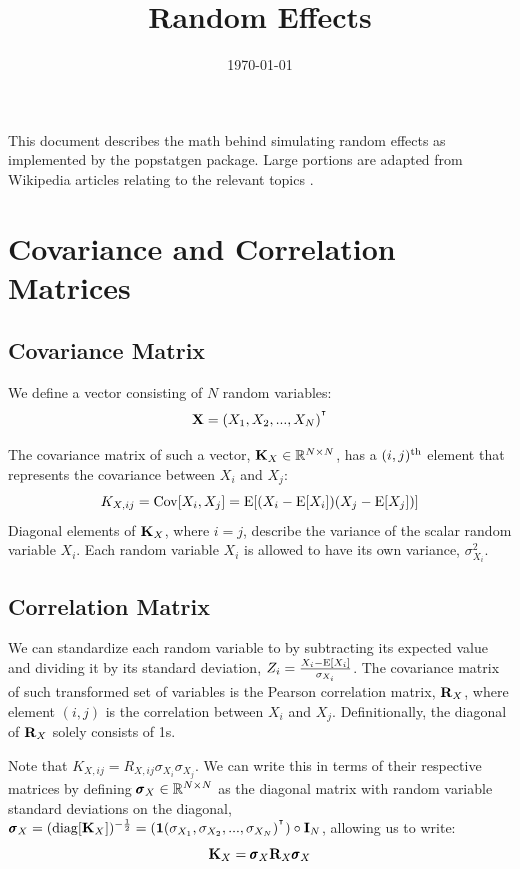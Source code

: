 \documentclass[12pt]{article}
\title{Random Effects}
\date{\today}
\begin{document}
\maketitle

This document describes the math behind simulating random effects as implemented by the popstatgen package.
Large portions are adapted from Wikipedia articles relating to the relevant topics \citep{wikipedia2026webCovMatrix,wikipedia2026webCorrelation,wikipedia2026webRandomEffects,wikipedia2026webMVN,wikipedia2026webCholesky}.

\section{Covariance and Correlation Matrices}
\subsection{Covariance Matrix}
We define a vector consisting of $N$ random variables:
$$ \mathbf{X} = (X_1 , X_2, ..., X_N)^{^\intercal} $$

The covariance matrix of such a vector, $\mathbf{K}_X \in \mathbb{R}^{N \times N}$, has a $(i,j)\textsuperscript{th}$ element that represents the covariance between $X_i$ and $X_j$:
$$ K_{X,ij} = \mathrm{Cov}[X_i,X_j] = \mathrm{E}[(X_i - \mathrm{E}[X_i]) (X_j - \mathrm{E}[X_j])]$$
Diagonal elements of $\mathbf{K}_X$, where $i=j$, describe the variance of the scalar random variable $X_i$.
Each random variable $X_i$ is allowed to have its own variance, $\sigma_{X_i}^2$.

\subsection{Correlation Matrix}
We can standardize each random variable to by subtracting its expected value and dividing it by its standard deviation, $Z_i = \frac{X_i - \mathrm{E}[X_i]}{\sigma_{X_i}}$.
The covariance matrix of such transformed set of variables is the Pearson correlation matrix, $\mathbf{R}_X$, where element $(i,j)$ is the correlation between $X_i$ and $X_j$. 
Definitionally, the diagonal of $\mathbf{R}_X$ solely consists of 1s.

Note that $K_{X,ij} = R_{X,ij} \sigma_{X_i} \sigma_{X_j}$. We can write this in terms of their respective matrices by defining $\pmb{\sigma}_X \in \mathbb{R}^{N \times N}$ as the diagonal matrix with random variable standard deviations on the diagonal, $\pmb{\sigma}_X = (\mathrm{diag}[\mathbf{K}_X])^{-\frac12} =  (\textbf{1} (\sigma_{X_1}, \sigma_{X_2}, ..., \sigma_{X_N})^{^\intercal}) \circ  \mathbf{I}_N$, allowing us to write:
$$ \mathbf{K}_X = \pmb{\sigma}_X \mathbf{R}_X \pmb{\sigma}_X $$
\end{document}
